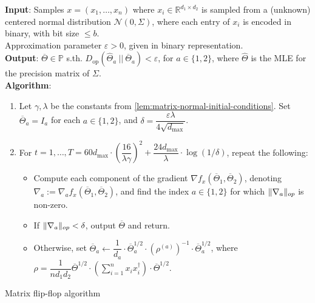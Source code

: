 \documentclass[aos]{imsart}
\theoremstyle{definition}
\numberwithin{equation}{section}
\DeclareMathOperator{\op}{op}
\DeclarePairedDelimiter{\norm}{\lVert}{\rVert}
\newcommand{\R}{{\mathbb{R}}}
\newcommand{\otheta}{\overline{\Theta}}
\newcommand{\htheta}{\widehat{\Theta}}
\newcommand{\eps}{\varepsilon}
\newcommand{\cN}{\mathcal{N}}
\newcommand{\SPD}{\mathbb{P}}
\newcommand{\samp}{x}
\def\dmax{d_{\max}}
\begin{document}
 

\begin{Algorithm}
\textbf{Input}: Samples $\samp = (\samp_1, \ldots, \samp_n)$ where $\samp_i \in \R^{d_1 \times d_2}$ is sampled from a (unknown) centered normal distribution $\cN(0, \Sigma)$, where each entry of $\samp_i$ is encoded in binary, with bit size $\le b$. \\ 
Approximation parameter $\eps > 0$, given in binary representation. \\[.3ex]

\textbf{Output}: $\otheta \in \SPD$ s.th. $D_{\op}(\htheta_a \ || \  \otheta_a) < \eps$, for $a \in \{1,2\}$, where $\htheta$ is the MLE for the precision matrix of $\Sigma$. \\[.3ex]

\textbf{Algorithm}:
\begin{enumerate}
\item\label{it:flip-flop step 1 matrix} Let $\gamma, \lambda$ be the constants from \cref{lem:matrix-normal-initial-conditions}. Set $\otheta_a = I_a$ for each $a \in \{1,2\}$, and $\delta = \dfrac{\eps \lambda}{4 \sqrt{\dmax}}$.

\vspace{5pt}

\item\label{it:flip-flop step 2 matrix} For $t=1,\dots,T = 60 \dmax \cdot \left( \dfrac{16}{\lambda \gamma} \right)^2 + \dfrac{24 \dmax}{\lambda} \cdot \log(1/\delta)$, repeat the following:

\vspace{5pt}

\begin{itemize}
\item Compute each component of the gradient $\nabla f_{\samp}(\otheta_1, \otheta_2)$, denoting $\nabla_a := \nabla_a f_{\samp}(\otheta_1, \otheta_2)$, and find the index $a \in \{1,2\}$ for which $\norm{\nabla_a}_{op}$ is non-zero.

\vspace{5pt}

\item
If $\norm{\nabla_a}_{op} < \delta$, output $\otheta$ and return.

\vspace{5pt}

\item Otherwise, set $\otheta_a \leftarrow \dfrac{1}{d_a} \cdot \otheta_a^{1/2} \cdot (\rho^{(a)})^{-1} \cdot \otheta_a^{1/2}$, where $\rho = \dfrac{1}{n d_1 d_2} \otheta^{1/2} \cdot \left( \sum_{i=1}^n x_i x_i^\dagger \right) \cdot \otheta^{1/2}$.
\end{itemize}
\end{enumerate}
\caption{Matrix flip-flop algorithm}\label{alg:flip-flop matrix}
\end{Algorithm}
\end{document}
